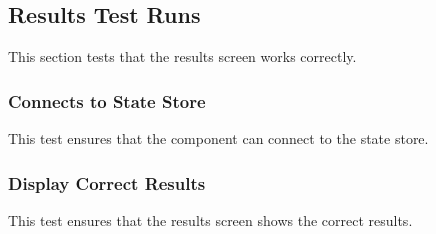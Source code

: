 \subsection{Results Test Runs} %
\label{sub:results_test_runs}
This section tests that the results screen works correctly.

\subsubsection{Connects to State Store} %
\label{ssub:connects_to_state_store}
This test ensures that the component can connect to the state store.

\subsubsection{Display Correct Results} %
\label{ssub:display_correct_results}
This test ensures that the results screen shows the correct results.
